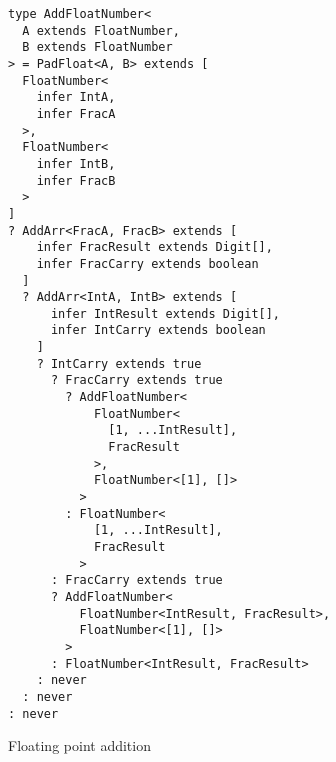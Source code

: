 \begin{listing}[ht!]
  \begin{verbatim}
type AddFloatNumber<
  A extends FloatNumber,
  B extends FloatNumber
> = PadFloat<A, B> extends [
  FloatNumber<
    infer IntA, 
    infer FracA
  >,
  FloatNumber<
    infer IntB,
    infer FracB
  >
]
? AddArr<FracA, FracB> extends [
    infer FracResult extends Digit[],
    infer FracCarry extends boolean
  ]
  ? AddArr<IntA, IntB> extends [
      infer IntResult extends Digit[],
      infer IntCarry extends boolean
    ]
    ? IntCarry extends true
      ? FracCarry extends true
        ? AddFloatNumber<
            FloatNumber<
              [1, ...IntResult], 
              FracResult
            >,
            FloatNumber<[1], []>
          >
        : FloatNumber<
            [1, ...IntResult], 
            FracResult
          >
      : FracCarry extends true
      ? AddFloatNumber<
          FloatNumber<IntResult, FracResult>,
          FloatNumber<[1], []>
        >
      : FloatNumber<IntResult, FracResult>
    : never
  : never
: never
\end{verbatim}
  \caption{Floating point addition}\label{lst:addition-float}
\end{listing}